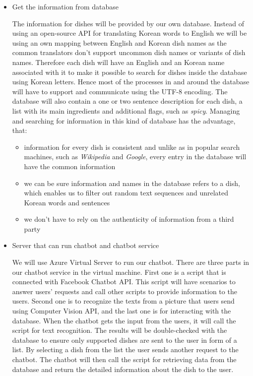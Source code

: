 \begin{itemize}
\item Get the information from database

The information for dishes will be provided by our own database. Instead of using an open-source API for translating Korean words to English we will be using an own mapping between English and Korean dish names as the common translators don't support uncommon dish names or variants of dish names. Therefore each dish will have an English and an Korean name associated with it to make it possible to search for dishes inside the database using Korean letters. Hence most of the processes in and around the database will have to support and communicate using the UTF-8 encoding. The database will also contain a one or two sentence description for each dish, a list with its main ingredients and additional flags, such as \emph{spicy}. Managing and searching for information in this kind of database has the advantage, that: \newline

\begin{itemize}
\item information for every dish is consistent and unlike as in popular search machines, such as \emph{Wikipedia} and \emph{Google}, every entry in the database will have the common information \newline
\item we can be sure information and names in the database refers to a dish, which enables us to filter out random text sequences and unrelated Korean words and sentences \newline
\item we don't have to rely on the authenticity of information from a third party \newline
\end{itemize}

\item Server that can run chatbot and chatbot service

We will use Azure Virtual Server to run our chatbot. There are three parts in our chatbot service in the virtual machine. First one is a script that is connected with Facebook Chatbot API. This script will have scenarios to answer users' requests and call other scripts to provide information to the users. Second one is to recognize the texts from a picture that users send using Computer Vision API, and the last one is for interacting with the database. When the chatbot gets the input from the users, it will call the script for text recognition. The results will be double-checked with the database to ensure only supported dishes are sent to the user in form of a list. By selecting a dish from the list the user sends another request to the chatbot. The chatbot will then call the script for retrieving data from the database and return the detailed information about the dish to the user. \newline


\end{itemize}
